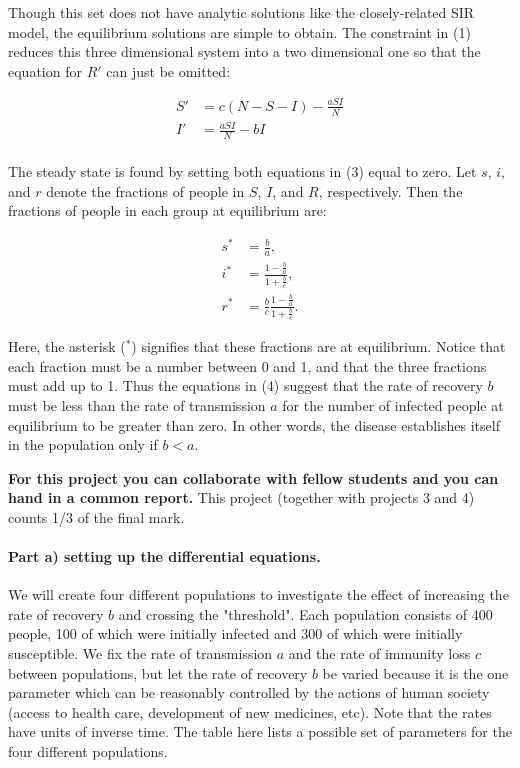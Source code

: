\documentclass[%
oneside,                 %
final,                   %
10pt]{article}
\begin{document}
Though this set does not have analytic solutions like the
closely-related SIR model, the equilibrium solutions are simple to
obtain. The constraint in (1) reduces this three dimensional system
into a two dimensional one so that the equation for $R'$ can just be
omitted:

\begin{equation}
\begin{split}
S'&=c(N-S-I)-\frac{aSI}{N}\\
I'&=\frac{aSI}{N}-bI\\
\end{split}
\end{equation}

The steady state is found by setting both equations in (3) equal to
zero. Let $s$, $i$, and $r$ denote the fractions of people in $S$,
$I$, and $R$, respectively. Then the fractions of people in each group
at equilibrium are:

\begin{equation}
\begin{split}
s^* &= \frac{b}{a},\\
i^* &= \frac{1-\frac{b}{a}}{1+\frac{b}{c}},\\
r^* &= \frac{b}{c}\frac{1-\frac{b}{a}}{1+\frac{b}{c}}.
\end{split}
\end{equation}

Here, the asterisk ($^*$) signifies that these fractions are at
equilibrium. Notice that each fraction must be a number between 0 and
1, and that the three fractions must add up to 1. Thus the equations
in (4) suggest that the rate of recovery $b$ must be less than the
rate of transmission $a$ for the number of infected people at
equilibrium to be greater than zero. In other words, the disease
establishes itself in the population only if $b<a$. 


\textbf{For this project you can collaborate with fellow students and you can  hand in a common report.}
This project (together with projects 3 and 4) counts 1/3 of the final mark.


\paragraph{Part a) setting up the differential equations.}
We will create four different populations to investigate the effect of
increasing the rate of recovery $b$ and crossing the "threshold". Each
population consists of 400 people, 100 of which were initially
infected and 300 of which were initially susceptible. We fix the  rate of
transmission $a$ and the rate of immunity loss $c$ 
between populations, but let the rate of recovery $b$ be varied because
it is the one parameter which can be reasonably controlled by the
actions of human society (access to health care, development of new
medicines, etc). Note that the rates have units of inverse time. 
The table here lists a possible set of parameters for the four different populations.
\end{document}
